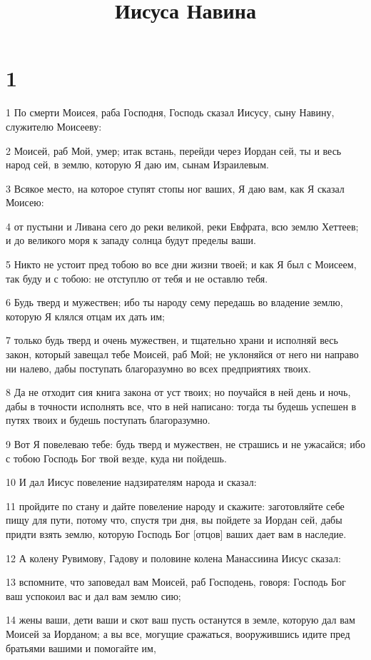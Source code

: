 

\title{Иисуса Навина}


\chapter{1}

\par 1 По смерти Моисея, раба Господня, Господь сказал Иисусу, сыну Навину, служителю Моисееву:
\par 2 Моисей, раб Мой, умер; итак встань, перейди через Иордан сей, ты и весь народ сей, в землю, которую Я даю им, сынам Израилевым.
\par 3 Всякое место, на которое ступят стопы ног ваших, Я даю вам, как Я сказал Моисею:
\par 4 от пустыни и Ливана сего до реки великой, реки Евфрата, всю землю Хеттеев; и до великого моря к западу солнца будут пределы ваши.
\par 5 Никто не устоит пред тобою во все дни жизни твоей; и как Я был с Моисеем, так буду и с тобою: не отступлю от тебя и не оставлю тебя.
\par 6 Будь тверд и мужествен; ибо ты народу сему передашь во владение землю, которую Я клялся отцам их дать им;
\par 7 только будь тверд и очень мужествен, и тщательно храни и исполняй весь закон, который завещал тебе Моисей, раб Мой; не уклоняйся от него ни направо ни налево, дабы поступать благоразумно во всех предприятиях твоих.
\par 8 Да не отходит сия книга закона от уст твоих; но поучайся в ней день и ночь, дабы в точности исполнять все, что в ней написано: тогда ты будешь успешен в путях твоих и будешь поступать благоразумно.
\par 9 Вот Я повелеваю тебе: будь тверд и мужествен, не страшись и не ужасайся; ибо с тобою Господь Бог твой везде, куда ни пойдешь.
\par 10 И дал Иисус повеление надзирателям народа и сказал:
\par 11 пройдите по стану и дайте повеление народу и скажите: заготовляйте себе пищу для пути, потому что, спустя три дня, вы пойдете за Иордан сей, дабы придти взять землю, которую Господь Бог [отцов] ваших дает вам в наследие.
\par 12 А колену Рувимову, Гадову и половине колена Манассиина Иисус сказал:
\par 13 вспомните, что заповедал вам Моисей, раб Господень, говоря: Господь Бог ваш успокоил вас и дал вам землю сию;
\par 14 жены ваши, дети ваши и скот ваш пусть останутся в земле, которую дал вам Моисей за Иорданом; а вы все, могущие сражаться, вооружившись идите пред братьями вашими и помогайте им,
